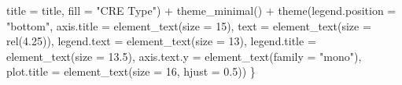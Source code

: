 \documentclass[
  letterpaper,
]{article}
\newenvironment{Shaded}{\begin{snugshade}}{\end{snugshade}}
\newcommand{\AttributeTok}[1]{\textcolor[rgb]{0.40,0.45,0.13}{#1}}
\newcommand{\DecValTok}[1]{\textcolor[rgb]{0.68,0.00,0.00}{#1}}
\newcommand{\FloatTok}[1]{\textcolor[rgb]{0.68,0.00,0.00}{#1}}
\newcommand{\FunctionTok}[1]{\textcolor[rgb]{0.28,0.35,0.67}{#1}}
\newcommand{\NormalTok}[1]{\textcolor[rgb]{0.00,0.23,0.31}{#1}}
\newcommand{\SpecialCharTok}[1]{\textcolor[rgb]{0.37,0.37,0.37}{#1}}
\newcommand{\StringTok}[1]{\textcolor[rgb]{0.13,0.47,0.30}{#1}}
\begin{document}
\begin{Shaded}
\begin{Highlighting}[]
         \AttributeTok{title =}\NormalTok{ title, }\AttributeTok{fill =} \StringTok{"CRE Type"}\NormalTok{) }\SpecialCharTok{+}
    \FunctionTok{theme\_minimal}\NormalTok{() }\SpecialCharTok{+}
    \FunctionTok{theme}\NormalTok{(}\AttributeTok{legend.position =} \StringTok{"bottom"}\NormalTok{,}
          \AttributeTok{axis.title =} \FunctionTok{element\_text}\NormalTok{(}\AttributeTok{size =} \DecValTok{15}\NormalTok{),}
          \AttributeTok{text =} \FunctionTok{element\_text}\NormalTok{(}\AttributeTok{size =} \FunctionTok{rel}\NormalTok{(}\FloatTok{4.25}\NormalTok{)),}
          \AttributeTok{legend.text =} \FunctionTok{element\_text}\NormalTok{(}\AttributeTok{size =} \DecValTok{13}\NormalTok{),}
          \AttributeTok{legend.title =} \FunctionTok{element\_text}\NormalTok{(}\AttributeTok{size =} \FloatTok{13.5}\NormalTok{),}
          \AttributeTok{axis.text.y =} \FunctionTok{element\_text}\NormalTok{(}\AttributeTok{family =} \StringTok{"mono"}\NormalTok{),}
          \AttributeTok{plot.title =} \FunctionTok{element\_text}\NormalTok{(}\AttributeTok{size =} \DecValTok{16}\NormalTok{, }\AttributeTok{hjust =} \FloatTok{0.5}\NormalTok{))}
\NormalTok{\}}


\end{Highlighting}
\end{Shaded}
\end{document}
